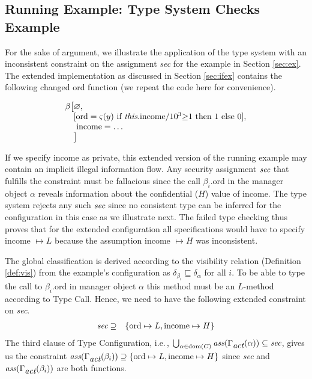 \documentclass[10pt, conference, compsocconf]{IEEEtran}
\newcommand{\symb}[1]{\makebox{\it #1}}
\newcommand\dom{{\rm dom}}
\newcommand\ie{i.e.\!\,, }
\newcommand{\da}{\delta_{\alpha}}
\begin{document}
{\subsection{Running Example: Type System Checks Example}
\label{sec:extest}
For the sake of argument, we illustrate the application of the type system
with an inconsistent constraint on the assignment {\it sec} for the example in Section \ref{sec:ex}. 
The extended implementation as discussed in Section \ref{sec:ifex} contains the following changed ord function (we repeat the code here for convenience).

\begin{small}
\[
 \begin{array}{l}
    \beta \big[\varnothing, \\
    \quad [ \text{ord} = \varsigma(y)\ \text{if}\ \text{{\it this}.income}\mathord{/}10^3 \mathord{\ge} 1\  \text{then}\
            1\ \text{else}\ 0 ],\\
    \  \quad \text{income} = \ldots\\
    \quad \big]
 \end{array}
\]
\end{small}

If we specify income as private, this extended version of the running example may contain an implicit 
illegal information flow.
Any security assignment $\symb{sec}$ that fulfills the constraint must be fallacious
since the call $\beta_i$.ord in the manager object $\alpha$ reveals information 
about the confidential ($H$) value of income. 
The type system rejects any such $\symb{sec}$ since no consistent type can be inferred for the 
configuration in this case as we illustrate next. 
The failed type checking thus proves that for the extended configuration all specifications
would have to specify income $\mapsto L$ because the assumption income $\mapsto H$ was inconsistent.

The global classification is derived according to the visibility relation (Definition \ref{def:vis})
from the example's configuration as $\delta_{\beta_i} \sqsubseteq \da$ for all $i$. 
To be able to type the call to $\beta_i.\text{ord}$ in manager object $\alpha$
this method must be an $L$-method according to {\sc Type Call}. Hence, we need
to have the following extended constraint on {\it sec}.
\[ 
\begin{array}{ll}
\symb{sec} \supseteq & \{\text{ord}\mapsto L, \text{income}\mapsto H\} 
\end{array} 
\]
The third clause of {\sc Type Configuration}, \ie 
$\bigcup_{\alpha \in \dom(C)} \symb{ass}(\Gamma_{\symb{act}}(\alpha)) \subseteq \symb{sec}$,
gives us the constraint 
$\symb{ass}(\Gamma_{\symb{act}}(\beta_i)) \supseteq \{ \text{ord}\mapsto L, \text{income}\mapsto H\}$
since {\it sec} and $\symb{ass}(\Gamma_{\symb{act}}(\beta_i))$ are both functions.

}
\end{document}
